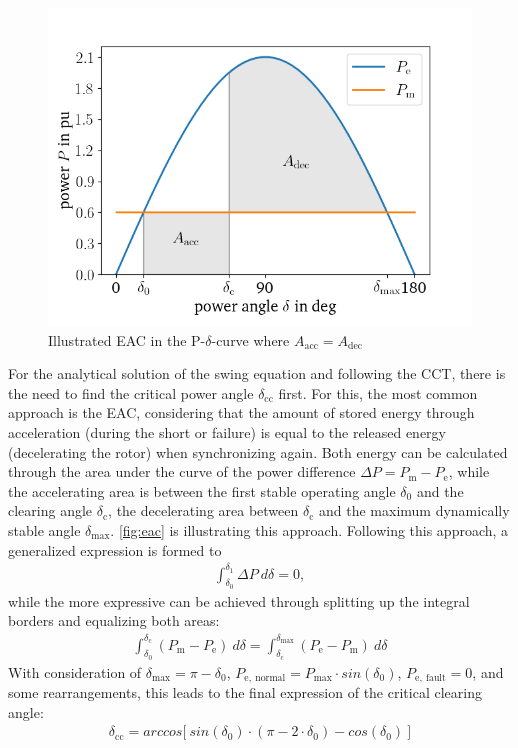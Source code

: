 \begin{figure}
        \centering
        \includegraphics[width=.6\textwidth]{python/plots/eac.png}
        \caption{Illustrated \acf{EAC} in the P-$\delta$-curve where $A_\mathrm{acc}=A_\mathrm{dec}$}
        \label{fig:eac}
\end{figure}
For the analytical solution of the swing equation and following the \acs{CCT}, there is the need to find the critical power angle $\delta_\mathrm{cc}$ first. For this, the most common approach is the \acf{EAC}, considering that the amount of stored energy through acceleration (during the short or failure) is equal to the released energy (decelerating the rotor) when synchronizing again. Both energy can be calculated through the area under the curve of the power difference $\Delta P=P_\mathrm{m}-P_\mathrm{e}$, while the accelerating area is between the first stable operating angle $\delta_\mathrm{0}$ and the clearing angle $\delta_\mathrm{c}$, the decelerating area between $\delta_\mathrm{c}$ and the maximum dynamically stable angle $\delta_\mathrm{max}$. \autoref{fig:eac} is illustrating this approach. Following this approach, a generalized expression is formed to
\begin{align}
        \int_{\delta_\mathrm{0}}^{\delta_\mathrm{1}}\Delta P~d\delta = 0 \label{eq:gen-eac},
\end{align}
while the more expressive can be achieved through splitting up the integral borders and equalizing both areas:
\begin{align}
        \int_{\delta_\mathrm{0}}^{\delta_\mathrm{c}}(P_\mathrm{m}-P_\mathrm{e})~d\delta = \int_{\delta_\mathrm{c}}^{\delta_\mathrm{max}}(P_\mathrm{e}-P_\mathrm{m})~d\delta \label{eq:big-eac}
\end{align}
With consideration of $\delta_\mathrm{max}=\pi-\delta_\mathrm{0}$, $P_\mathrm{e,~normal}=P_\mathrm{max} \cdot sin(\delta_\mathrm{0})$, $P_\mathrm{e,~fault}=0$, and some rearrangements, this leads to the final expression of the critical clearing angle:
\begin{align}
        \delta_\mathrm{cc}=arccos\big[~sin(\delta_\mathrm{0}) \cdot (\pi-2 \cdot \delta_\mathrm{0})-cos(\delta_\mathrm{0})~\big] \label{eq:delta-cc}
\end{align}

